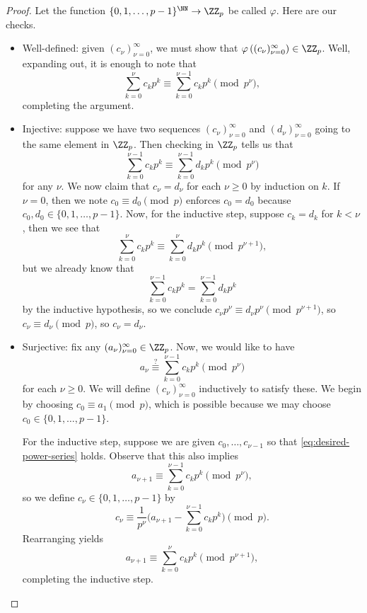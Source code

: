 \documentclass[../notes.tex]{subfiles}
\begin{document}
\begin{proof}
	Let the function $\{0,1,\ldots,p-1\}^\NN\to\ZZ_p$ be called $\varphi$. Here are our checks.
	\begin{itemize}
		\item Well-defined: given $(c_\nu)_{\nu=0}^\infty$, we must show that $\varphi\left((c_\nu)_{\nu=0}^\infty\right)\in\ZZ_p$. Well, expanding out, it is enough to note that
		\[\sum_{k=0}^{\nu}c_kp^k\equiv\sum_{k=0}^{\nu-1}c_kp^k\pmod{p^\nu},\]
		completing the argument.
		\item Injective: suppose we have two sequences $(c_\nu)_{\nu=0}^\infty$ and $(d_\nu)_{\nu=0}^\infty$ going to the same element in $\ZZ_p$. Then checking in $\ZZ_p$ tells us that
		\[\sum_{k=0}^{\nu-1}c_kp^k\equiv\sum_{k=0}^{\nu-1}d_kp^k\pmod{p^\nu}\]
		for any $\nu$. We now claim that $c_\nu=d_\nu$ for each $\nu\ge0$ by induction on $k$. If $\nu=0$, then we note $c_0\equiv d_0\pmod p$ enforces $c_0=d_0$ because $c_0,d_0\in\{0,1,\ldots,p-1\}$. Now, for the inductive step, suppose $c_k=d_k$ for $k<\nu$, then we see that
		\[\sum_{k=0}^{\nu}c_kp^k\equiv\sum_{k=0}^{\nu}d_kp^k\pmod{p^{\nu+1}},\]
		but we already know that
		\[\sum_{k=0}^{\nu-1}c_kp^k=\sum_{k=0}^{\nu-1}d_kp^k\]
		by the inductive hypothesis, so we conclude $c_\nu p^\nu\equiv d_\nu p^\nu\pmod{p^{\nu+1}}$, so $c_\nu\equiv d_\nu\pmod p$, so $c_\nu=d_\nu$.
		\item Surjective: fix any $(a_\nu)_{\nu=0}^\infty\in\ZZ_p$. Now, we would like to have
		\begin{equation}
			a_\nu\stackrel?\equiv\sum_{k=0}^{\nu-1}c_kp^k\pmod{p^\nu} \label{eq:desired-power-series}
		\end{equation}
		for each $\nu\ge0$. We will define $(c_\nu)_{\nu=0}^\infty$ inductively to satisfy these. We begin by choosing $c_0\equiv a_1\pmod p$, which is possible because we may choose $c_0\in\{0,1,\ldots,p-1\}$.

		For the inductive step, suppose we are given $c_0,\ldots,c_{\nu-1}$ so that \eqref{eq:desired-power-series} holds. Observe that this also implies
		\[a_{\nu+1}\equiv\sum_{k=0}^{\nu-1}c_kp^k\pmod{p^\nu},\]
		so we define $c_\nu\in\{0,1,\ldots,p-1\}$ by
		\[c_\nu\equiv\frac1{p^\nu}\Bigg(a_{\nu+1}-\sum_{k=0}^{\nu-1}c_kp^k\Bigg)\pmod p.\]
		Rearranging yields
		\[a_{\nu+1}\equiv\sum_{k=0}^\nu c_kp^k\pmod{p^{\nu+1}},\]
		completing the inductive step.
		\qedhere
	\end{itemize}
\end{proof}
\end{document}
